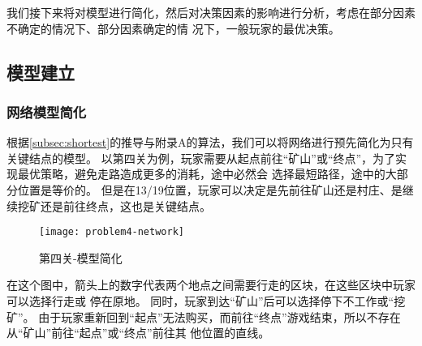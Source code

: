 \documentclass[withoutpreface,bwprint]{cumcmthesis} %
\begin{document}
我们接下来将对模型进行简化，然后对决策因素的影响进行分析，考虑在部分因素不确定的情况下、部分因素确定的情
况下，一般玩家的最优决策。

\subsection{模型建立}


\subsubsection{网络模型简化}
\label{subsub:simplify}

根据\ref{subsec:shortest}的推导与附录A的算法，我们可以将网络进行预先简化为只有关键结点的模型。
以第四关为例，玩家需要从起点前往“矿山”或“终点”，为了实现最优策略，避免走路造成更多的消耗，途中必然会
选择最短路径，途中的大部分位置是等价的。
但是在13/19位置，玩家可以决定是先前往矿山还是村庄、是继续挖矿还是前往终点，这也是关键结点。


\begin{figure}[!h]
    \centering
    \texttt{[image: problem4-network]}
    \caption{第四关-模型简化}
    \label{fig:example-network}
\end{figure}

\noindent 在这个图中，箭头上的数字代表两个地点之间需要行走的区块，在这些区块中玩家可以选择行走或
停在原地。
同时，玩家到达“矿山”后可以选择停下不工作或“挖矿”。
由于玩家重新回到“起点”无法购买，而前往“终点”游戏结束，所以不存在从“矿山”前往“起点”或“终点”前往其
他位置的直线。


\end{document}
